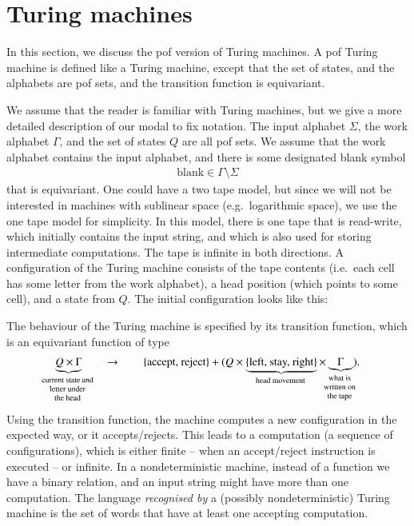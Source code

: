 	  








\section{Turing machines}
\label{sec:pof-turing-machines-equality}
In this section, we discuss the pof version of Turing machines.
A pof Turing machine is defined like a Turing machine, except that the set of states, and the alphabets are pof sets, and the transition function is equivariant. 

We assume that the reader is familiar with Turing machines, but we give a more detailed description of our modal to fix notation.
The input alphabet $\Sigma$, the work alphabet $\Gamma$, and the set of states $Q$ are all pof sets. We assume that the work alphabet contains the input alphabet, and there is some designated blank symbol
\begin{align*}
\text{blank} \in \Gamma \setminus \Sigma
\end{align*}
that is equivariant. One could have a two tape model, but since we will not be interested in machines with sublinear space (e.g.~logarithmic space), we use the one tape model for simplicity. In this model, there is one  tape that is read-write, which initially contains the input string, and which is also used for storing intermediate computations.  The tape is infinite in both directions. A configuration of the Turing machine consists of the tape contents (i.e.~each cell has some letter from the work alphabet), a head position (which points to some cell), and a state from $Q$. The initial configuration looks like this: 

The behaviour of the Turing machine is specified by its transition function, which is an equivariant function of type 
        \begin{gather*}
            \myunderbrace{Q \times \Gamma}{current state and \\ letter  under \\ the head}   
            \qquad \rightarrow \qquad 
            \set{\text{accept, reject}} +  (Q \times
            \myunderbrace{\set{\text{left, stay, right}}}{head movement} \times 
            \myunderbrace{\Gamma}{what is \\ written on \\ the  tape}).
            \end{gather*}
Using the transition function, the machine computes a new configuration in the expected way, or it accepts/rejects. This leads to a computation (a sequence of configurations), which is either finite -- when an accept/reject instruction is executed -- or infinite. 
In a nondeterministic machine, instead of a function we have a binary relation, and an input string might have more than one computation. The language \emph{recognised by}  a (possibly nondeterministic) Turing machine is the set of words that have at least one accepting computation.


